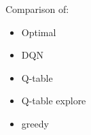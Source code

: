 \documentclass[aspectratio=169]{beamer}
\begin{document}
\begin{frame}
    \frametitle{\secname}
    \framesubtitle{\subsecname}

    \begin{minipage}{0.27\textwidth}
        Comparison of:
        \begin{itemize}
            \item Optimal
            \item DQN
            \item Q-table
            \item Q-table explore
            \item greedy
        \end{itemize}
    \end{minipage}
    \begin{minipage}{0.65\textwidth}
    \begin{figure}
        \centering
        

\end{figure}
\end{minipage}
\end{frame}
\end{document}
